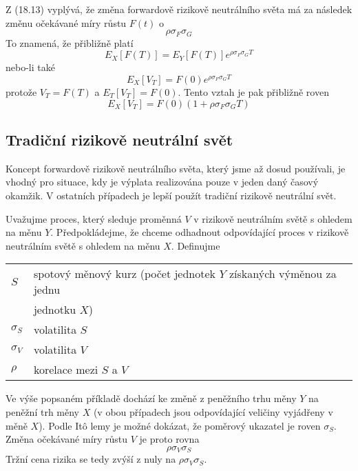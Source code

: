 \documentclass[a4paper]{book}
\begin{document}
Z (18.13) vyplývá, že změna forwardově rizikově neutrálního světa má za následek změnu očekávané míry růstu $F(t)$ o
\begin{equation*}
\rho  \sigma_F \sigma_G
\end{equation*}
To znamená, že přibližně platí
\begin{equation*}
E_X[F(T)] = E_Y[F(T)]e^{\rho  \sigma_F \sigma_G T}
\end{equation*}
nebo-li také
\begin{equation*}
E_X[V_T] = F(0)e^{\rho  \sigma_F \sigma_G T}
\end{equation*}
protože $V_T = F(T)$ a $E_T[V_T]=F(0)$. Tento vztah je pak přibližně roven
\begin{equation*}
E_X[V_T]=F(0)(1 + \rho  \sigma_F \sigma_G T)
\end{equation*}

\subsection{Tradiční rizikově neutrální svět}

Koncept forwardově rizikově neutrálního světa, který jsme až dosud používali, je vhodný pro situace, kdy je výplata realizována pouze v jeden daný časový okamžik. V ostatních případech je lepší použít tradiční rizikově neutrální svět.

Uvažujme proces, který sleduje proměnná $V$ v rizikově neutrálním světě s ohledem na měnu $Y$. Předpokládejme, že chceme odhadnout odpovídající proces v rizikově neutrálním světě s ohledem na měnu $X$. Definujme
\begin{center}
\begin{tabular}{l l}
$S$ & spotový měnový kurz (počet jednotek $Y$ získaných výměnou za jednu\\
 & jednotku $X$)\\
$\sigma_S$ & volatilita $S$\\
$\sigma_V$ & volatilita $V$\\
$\rho$ & korelace mezi $S$ a $V$\\
\end{tabular}
\end{center}
Ve výše popsaném příkladě dochází ke změně z peněžního trhu měny $Y$ na peněžní trh měny $X$ (v obou případech jsou odpovídající veličiny vyjádřeny v měně $X$). Podle It\^o lemy je možné dokázat, že poměrový ukazatel je roven $\sigma_S$. Změna očekávané míry růstu $V$ je proto rovna
\begin{equation*}
\rho \sigma_V \sigma_S
\end{equation*}
Tržní cena rizika se tedy zvýší z nuly na $\rho \sigma_V \sigma_S$.
\end{document}
